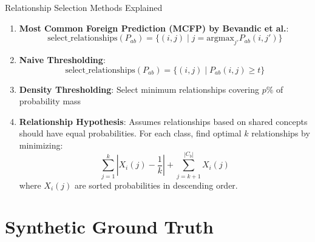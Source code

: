 \documentclass[aspectratio=169]{beamer}
\begin{document}
\begin{frame}{Relationship Selection Methods Explained}
    \begin{enumerate}
        \item \textbf{Most Common Foreign Prediction (MCFP) by Bevandic et al.}:
              \begin{equation}
                  \text{select\_relationships}(P_{ab}) = \{(i, j) \mid j = \text{argmax}_{j'} P_{ab}(i, j')\}
              \end{equation}

        \item \textbf{Naive Thresholding}:
              \begin{equation}
                  \text{select\_relationships}(P_{ab}) = \{(i, j) \mid P_{ab}(i, j) \geq t\}
              \end{equation}

        \item \textbf{Density Thresholding}: Select minimum relationships covering $p\%$ of probability mass

        \item \textbf{Relationship Hypothesis}: Assumes relationships based on shared concepts should have equal probabilities. For each class, find optimal $k$ relationships by minimizing:
              \begin{equation}
                  \sum_{j=1}^k \left| X_i(j) - \frac{1}{k} \right| + \sum_{j=k+1}^{|C_b|} X_i(j)
              \end{equation}
              where $X_i(j)$ are sorted probabilities in descending order.
    \end{enumerate}
\end{frame}

\section{Synthetic Ground Truth}
\end{document}
